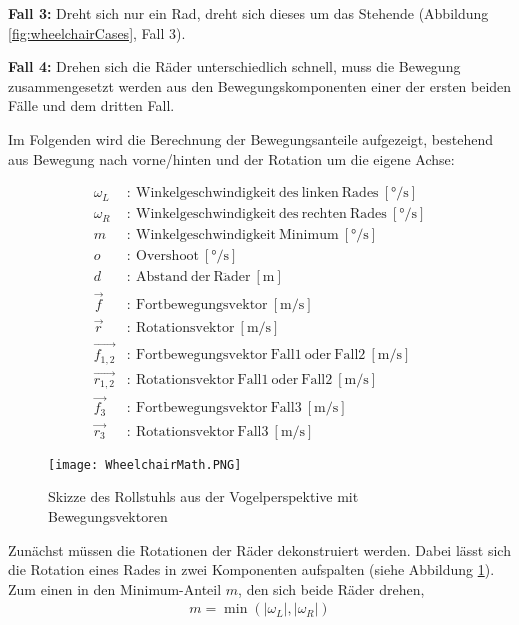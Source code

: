 \textbf{Fall 3:} Dreht sich nur ein Rad, dreht sich dieses um das Stehende (Abbildung \ref{fig:wheelchairCases}, Fall 3).

\textbf{Fall 4:} Drehen sich die Räder unterschiedlich schnell, muss die Bewegung zusammengesetzt werden aus den Bewegungskomponenten einer der ersten beiden Fälle und dem dritten Fall.

Im Folgenden wird die Berechnung der Bewegungsanteile aufgezeigt, bestehend aus Bewegung nach vorne/hinten und der Rotation um die eigene Achse:

\begin{align}
    \omega_L      & : \ \mathrm{Winkelgeschwindigkeit\ des\ linken\ Rades}\ [\si{\degree/\second}]  \\
    \omega_R      & : \ \mathrm{Winkelgeschwindigkeit\ des\ rechten\ Rades}\ [\si{\degree/\second}] \\
    m             & : \ \mathrm{Winkelgeschwindigkeit\ Minimum}\ [\si{\degree/\second}]             \\
    o             & : \ \mathrm{Overshoot}\ [\si{\degree/\second}]                                  \\
    d             & : \ \mathrm{Abstand\ der\ R\ddot{a}der}\ [\si{\metre}]                          \\
    \vec{f}       & : \ \mathrm{Fortbewegungsvektor}\ [\si{\metre/\second}]                         \\
    \vec{r}       & : \ \mathrm{Rotationsvektor}\ [\si{\metre/\second}]                             \\
    \vec{f_{1,2}} & : \ \mathrm{Fortbewegungsvektor\ Fall1\ oder\ Fall2}\ [\si{\metre/\second}]     \\
    \vec{r_{1,2}} & : \ \mathrm{Rotationsvektor\ Fall1\ oder\ Fall2}\ [\si{\metre/\second}]         \\
    \vec{f_{3}}   & : \ \mathrm{Fortbewegungsvektor\ Fall3}\ [\si{\metre/\second}]                  \\
    \vec{r_{3}}   & : \ \mathrm{Rotationsvektor\ Fall3}\ [\si{\metre/\second}]
\end{align}

\begin{figure}[h]
    \centering
    \texttt{[image: WheelchairMath.PNG]}
    \caption{Skizze des Rollstuhls aus der Vogelperspektive mit Bewegungsvektoren}
    \label{fig:wheelchairMath}
\end{figure}

Zunächst müssen die Rotationen der Räder dekonstruiert werden.
Dabei lässt sich die Rotation eines Rades in zwei Komponenten aufspalten (siehe Abbildung \ref{fig:wheelchairMath}).
Zum einen in den Minimum-Anteil $m$, den sich beide Räder drehen,
\begin{align}
    m = \min{(\left| \omega_L \right|,\left| \omega_R\right|)}
\end{align}

